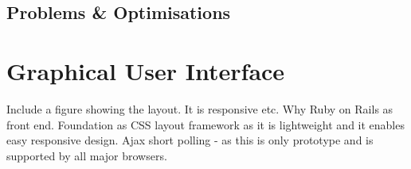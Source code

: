 	\subsection{Problems \& Optimisations}
	
\section{Graphical User Interface}
Include a figure showing the layout. It is responsive etc.
Why Ruby on Rails as front end. Foundation as CSS layout framework as it is lightweight and it enables easy responsive design.
Ajax short polling - as this is only prototype and is supported by all major browsers.




